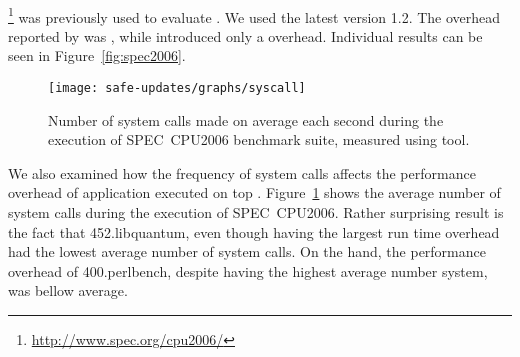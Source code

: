 \paragraph{\speczerosix}\footnote{\url{http://www.spec.org/cpu2006/}}
was previously used to evaluate \mx. We used the latest version 1.2.  The
overhead reported by \mx was \mxSpec, while \varan introduced only
a \speczerosixOneFollower overhead.
Individual results can be seen in Figure~\ref{fig:spec2006}.

\begin{figure}[ht]
\begin{center}
\texttt{[image: safe-updates/graphs/syscall]}
\caption{Number of system calls made on average each second during the
execution of SPEC~CPU2006 benchmark suite, measured using 
tool.}
\label{fig:syscall}
\end{center}
\end{figure}

We also examined how the frequency of system calls affects the
performance overhead of application executed on top \mx.
Figure~\ref{fig:syscall} shows the average number of system calls during
the execution of SPEC~CPU2006. Rather surprising result is the fact that
\textsf{452.libquantum}, even though having the largest run time
overhead had the lowest average number of system calls.  On the hand,
the performance overhead of \textsf{400.perlbench}, despite having the
highest average number system, was bellow average.



